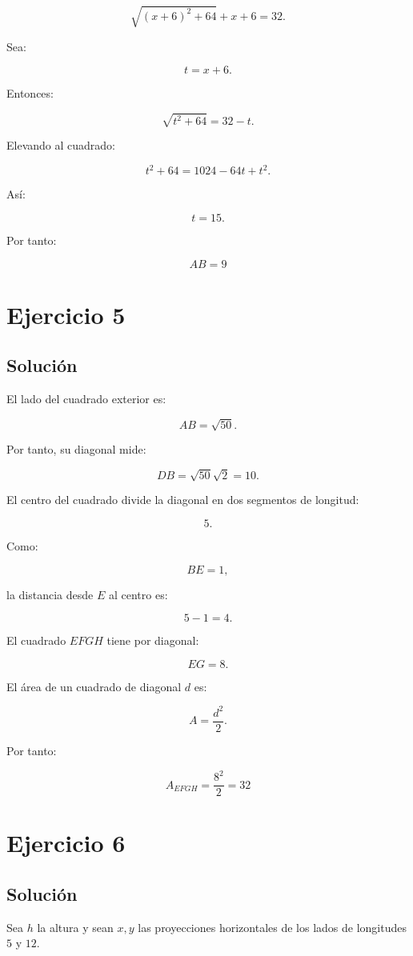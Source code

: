 \documentclass[11pt,a4paper]{article}
\begin{document}
\[
\sqrt{(x+6)^2+64}
+
x+6
=
32.
\]

Sea:

\[
t=x+6.
\]

Entonces:

\[
\sqrt{t^2+64}=32-t.
\]

Elevando al cuadrado:

\[
t^2+64
=
1024-64t+t^2.
\]

Así:

\[
t=15.
\]

Por tanto:

\[
\boxed{AB=9}
\]

\section{Ejercicio 5}
\subsection{Solución}

El lado del cuadrado exterior es:

\[
AB=\sqrt{50}.
\]

Por tanto, su diagonal mide:

\[
DB
=
\sqrt{50}\sqrt2
=
10.
\]

El centro del cuadrado divide la diagonal en dos segmentos de longitud:

\[
5.
\]

Como:

\[
BE=1,
\]

la distancia desde \(E\) al centro es:

\[
5-1=4.
\]

El cuadrado \(EFGH\) tiene por diagonal:

\[
EG=8.
\]

El área de un cuadrado de diagonal \(d\) es:

\[
A=\frac{d^2}{2}.
\]

Por tanto:

\[
\boxed{
A_{EFGH}
=
\frac{8^2}{2}
=
32
}
\]

\section{Ejercicio 6}
\subsection{Solución}

Sea \(h\) la altura y sean \(x,y\) las proyecciones horizontales de los lados de longitudes \(5\) y \(12\).
\end{document}
